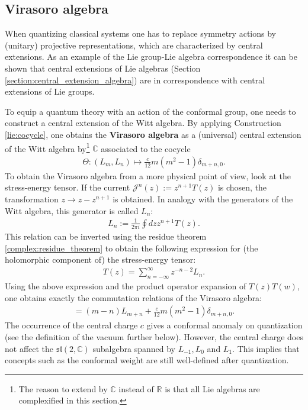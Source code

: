 \subsection{Virasoro algebra}

    When quantizing classical systems one has to replace symmetry actions by (unitary) projective representations, which are characterized by central extensions. As an example of the Lie group-Lie algebra correspondence it can be shown that central extensions of Lie algebras (Section \ref{section:central_extension_algebra}) are in correspondence with central extensions of Lie groups.

    To equip a quantum theory with an action of the conformal group, one needs to construct a central extension of the Witt algebra. By applying Construction \ref{lie:cocycle}, one obtains the \textbf{Virasoro algebra} as a (universal) central extension of the Witt algebra by\footnote{The reason to extend by $\mathbb{C}$ instead of $\mathbb{R}$ is that all Lie algebras are complexified in this section.} $\mathbb{C}$ associated to the cocycle
    \begin{gather}
        \Theta:(L_m,L_n)\mapsto\frac{c}{12}m(m^2-1)\delta_{m+n,0}.
    \end{gather}
    To obtain the Virasoro algebra from a more physical point of view, look at the stress-energy tensor. If the current $\mathcal{J}^n(z) := z^{n+1}T(z)$ is chosen, the transformation $z\longrightarrow z-z^{n+1}$ is obtained. In analogy with the generators of the Witt algebra, this generator is called $L_n$:
    \begin{gather}
        L_n := \frac{1}{2\pi i}\oint dzz^{n+1}T(z).
    \end{gather}
    This relation can be inverted using the residue theorem \ref{complex:residue_theorem} to obtain the following expression for (the holomorphic component of) the stress-energy tensor:
    \begin{gather}
        T(z) = \sum_{n=-\infty}^\infty z^{-n-2}L_n.
    \end{gather}
    Using the above expression and the product operator expansion of $T(z)T(w)$, one obtains exactly the commutation relations of the Virasoro algebra:
    \begin{gather}
        [L_m,L_n] = (m-n)L_{m+n} + \frac{c}{12}m(m^2-1)\delta_{m+n,0}.
    \end{gather}
    The occurrence of the central charge $c$ gives a conformal anomaly on quantization (see the definition of the vacuum further below). However, the central charge does not affect the $\mathfrak{sl}(2,\mathbb{C})$ subalgebra spanned by $L_{-1},L_0$ and $L_1$. This implies that concepts such as the conformal weight are still well-defined after quantization.

